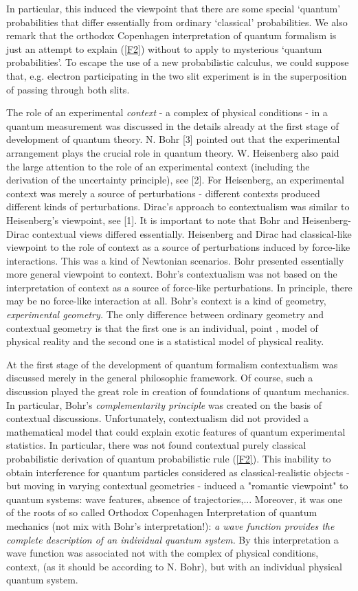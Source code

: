 \documentclass[12pt,oneside,final,a4paper]{article}
\begin{document}
In particular, this induced the viewpoint that there are some special 
`quantum' probabilities that differ essentially from ordinary `classical' probabilities. We also remark that 
the orthodox Copenhagen interpretation of quantum formalism is just an attempt to explain (\ref{F2}) without 
to apply to mysterious `quantum probabilities'. To escape the use of a new probabilistic calculus, we could 
suppose that, e.g. electron participating in the two slit experiment is in the superposition of passing through
both slits.


The role of an experimental {\it context} - a complex of physical conditions - in a
quantum measurement was discussed in the details already at the first stage of development 
of quantum theory. N. Bohr [3] pointed out that the experimental arrangement plays the crucial role
in quantum theory. W. Heisenberg also paid the large attention to the role of an 
experimental context (including the derivation of the uncertainty principle), see [2].
For Heisenberg, an experimental context was merely a source of perturbations - different
contexts produced different kinds of perturbations.  Dirac's approach to contextualism was 
similar to Heisenberg's viewpoint, see [1].  It is important
to note that Bohr and Heisenberg-Dirac contextual views  differed essentially. Heisenberg and Dirac
had classical-like viewpoint to the role of context as a source of perturbations induced by
force-like interactions. This was a kind of Newtonian scenarios. Bohr presented essentially more
general viewpoint to context. Bohr's contextualism was not based on the interpretation of context
as a source of force-like perturbations. In principle, there may be no force-like interaction
at all. Bohr's context is a kind of geometry, {\it experimental geometry.} The only difference
between ordinary geometry and contextual geometry  is that the first one is an individual,
point , model of physical reality and the second one is a statistical model of physical reality.

At the first stage of the development of quantum formalism contextualism was discussed
merely in the general philosophic framework. Of course, such a discussion played the great
role in creation of foundations of quantum mechanics. In particular, Bohr's {\it complementarity principle}
was created on the basis of contextual discussions. Unfortunately, contextualism
did not provided a mathematical model that could explain exotic features of quantum experimental
statistics. In particular, there was not found contextual purely classical probabilistic
derivation of quantum probabilistic rule (\ref{F2}). This inability to obtain interference for
quantum particles considered as classical-realistic objects - but moving in varying contextual
geometries - induced a "romantic viewpoint" to quantum systems: wave features, absence of trajectories,...
Moreover, it was one of the roots of so called Orthodox Copenhagen Interpretation of quantum
mechanics (not mix with Bohr's interpretation!): {\it a wave function provides
the complete description of an individual quantum system.} By this interpretation
a wave function was associated not with the complex of physical conditions, context,
(as it should be according to N. Bohr), but with an individual physical quantum system.
\end{document}
